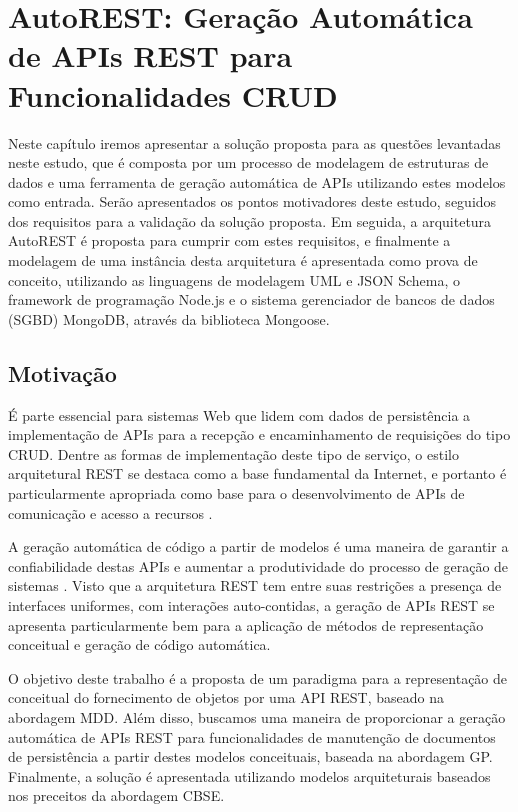 \chapter{AutoREST: Geração Automática de APIs REST para Funcionalidades CRUD}
\label{chap:autorest}

Neste capítulo iremos apresentar a solução proposta para as questões levantadas neste estudo, que é composta por um processo de modelagem de estruturas de dados e uma ferramenta de geração automática de APIs utilizando estes modelos como entrada. Serão apresentados os pontos motivadores deste estudo, seguidos dos requisitos para a validação da solução proposta. Em seguida, a arquitetura AutoREST é proposta para cumprir com estes requisitos, e finalmente a modelagem de uma instância desta arquitetura é apresentada como prova de conceito, utilizando as linguagens de modelagem UML e JSON Schema, o framework de programação Node.js e o sistema gerenciador de bancos de dados (SGBD) MongoDB, através da biblioteca Mongoose.


\section{Motivação}

É parte essencial para sistemas Web que lidem com dados de persistência a implementação de APIs para a recepção e encaminhamento de requisições do tipo CRUD. Dentre as formas de implementação deste tipo de serviço, o estilo arquitetural REST se destaca como a base fundamental da Internet, e portanto é particularmente apropriada como base para o desenvolvimento de APIs de comunicação e acesso a recursos \cite{FIELDING:2000}.

A geração automática de código a partir de modelos é uma maneira de garantir a confiabilidade destas APIs e aumentar a produtividade do processo de geração de sistemas \cite{SELIC:2003}. Visto que a arquitetura REST tem entre suas restrições a presença de interfaces uniformes, com interações auto-contidas, a geração de APIs REST se apresenta particularmente bem para a aplicação de métodos de representação conceitual e geração de código automática.

O objetivo deste trabalho é a proposta de um paradigma para a representação de conceitual do fornecimento de objetos por uma API REST, baseado na abordagem MDD. Além disso, buscamos uma maneira de proporcionar a geração automática de APIs REST para funcionalidades de manutenção de documentos de persistência a partir destes modelos conceituais, baseada na abordagem GP. Finalmente, a solução é apresentada utilizando modelos arquiteturais baseados nos preceitos da abordagem CBSE.

